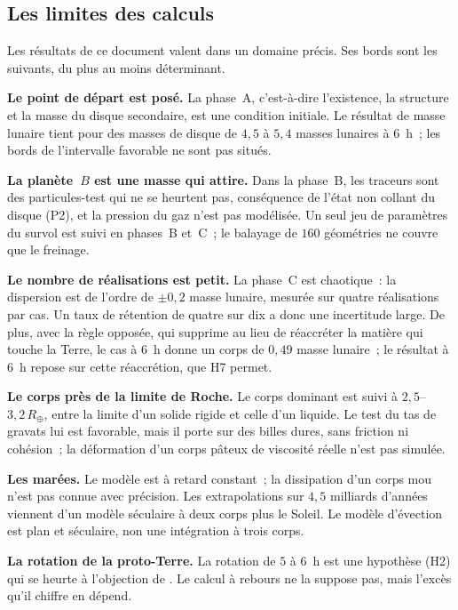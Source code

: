 \documentclass[11pt,a4paper]{article}
\newcommand{\Rt}{\ensuremath{R_\oplus}}
\begin{document}
\subsection{Les limites des calculs}
\label{sec:limites}

Les résultats de ce document valent dans un domaine précis. Ses bords sont les suivants, du plus au moins déterminant.

\textbf{Le point de départ est posé.} La phase~A, c'est-à-dire l'existence, la structure et la masse du disque secondaire, est une condition initiale. Le résultat de masse lunaire tient pour des masses de disque de $4{,}5$ à $5{,}4$ masses lunaires à $6$~h~; les bords de l'intervalle favorable ne sont pas situés.

\textbf{La planète~$B$ est une masse qui attire.} Dans la phase~B, les traceurs sont des particules-test qui ne se heurtent pas, conséquence de l'état non collant du disque (P2), et la pression du gaz n'est pas modélisée. Un seul jeu de paramètres du survol est suivi en phases~B et~C~; le balayage de $160$ géométries ne couvre que le freinage.

\textbf{Le nombre de réalisations est petit.} La phase~C est chaotique~: la dispersion est de l'ordre de $\pm0{,}2$ masse lunaire, mesurée sur quatre réalisations par cas. Un taux de rétention de quatre sur dix a donc une incertitude large. De plus, avec la règle opposée, qui supprime au lieu de réaccréter la matière qui touche la Terre, le cas à $6$~h donne un corps de $0{,}49$ masse lunaire~; le résultat à $6$~h repose sur cette réaccrétion, que H7 permet.

\textbf{Le corps près de la limite de Roche.} Le corps dominant est suivi à $2{,}5$--$3{,}2\,\Rt$, entre la limite d'un solide rigide et celle d'un liquide. Le test du tas de gravats lui est favorable, mais il porte sur des billes dures, sans friction ni cohésion~; la déformation d'un corps pâteux de viscosité réelle n'est pas simulée.

\textbf{Les marées.} Le modèle est à retard constant~; la dissipation d'un corps mou n'est pas connue avec précision. Les extrapolations sur $4{,}5$ milliards d'années viennent d'un modèle séculaire à deux corps plus le Soleil. Le modèle d'évection est plan et séculaire, non une intégration à trois corps.

\textbf{La rotation de la proto-Terre.} La rotation de $5$ à $6$~h est une hypothèse (H2) qui se heurte à l'objection de \citet{DonesTremaine1993}. Le calcul à rebours ne la suppose pas, mais l'excès qu'il chiffre en dépend.
\end{document}
